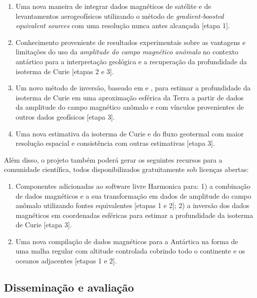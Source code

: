 \documentclass[12pt,a4paper,oneside]{book}
\begin{document}
\begin{enumerate}
  \item Uma nova maneira de integrar dados magnéticos de satélite e de
    levantamentos aerogeofísicos utilizando o método de
    \textit{gradient-boosted equivalent sources} \citep{Soler2021} com uma
    resolução nunca antes alcançada [etapa 1].
  \item Conhecimento proveniente de resultados experimentais sobre as vantagens
    e limitações do uso da \textit{amplitude do campo magnético anômalo} no
    contexto antártico para a interpretação geológica \citep{Melo2021} e a
    recuperação da profundidade da isoterma de Curie \citep{HidalgoGato2021}
    [etapas 2 e 3].
  \item Um novo método de inversão, baseado em \citet{Uieda2017} e
    \citet{HidalgoGato2021}, para estimar a profundidade da isoterma de Curie
    em uma aproximação esférica da Terra a partir de dados da amplitude do
    campo magnético anômalo e com vínculos provenientes de outros dados
    geofísicos [etapa 3].
  \item Uma nova estimativa da isoterma de Curie e do fluxo geotermal com maior
    resolução espacial e consistência com outras estimativas [etapa 3].
\end{enumerate}

\noindent
Além disso, o projeto também poderá gerar os seguintes recursos para a
comunidade científica, todos disponibilizados gratuitamente sob licenças
abertas:

\begin{enumerate}
  \item Componentes adicionadas ao software livre Harmonica para:
    1) a combinação de dados magnéticos e a sua transformação em dados de
       amplitude do campo anômalo utilizando fontes equivalentes [etapas 1 e
       2];
    2) a inversão dos dados magnéticos em coordenadas esféricas para estimar a
       profundidade da isoterma de Curie [etapa 3].
  \item Uma nova compilação de dados magnéticos para a Antártica na forma de
    uma malha regular com altitude controlada cobrindo todo o continente e os
    oceanos adjacentes [etapas 1 e 2].
\end{enumerate}

\subsection{Disseminação e avaliação}
\end{document}
